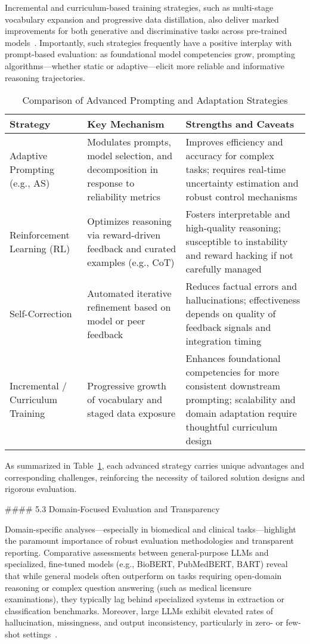 \documentclass[11pt]{article}
\begin{document}
Incremental and curriculum-based training strategies, such as multi-stage vocabulary expansion and progressive data distillation, also deliver marked improvements for both generative and discriminative tasks across pre-trained models~\cite{49}. Importantly, such strategies frequently have a positive interplay with prompt-based evaluation: as foundational model competencies grow, prompting algorithms—whether static or adaptive—elicit more reliable and informative reasoning trajectories.

\begin{table}[ht]
\centering
\caption{Comparison of Advanced Prompting and Adaptation Strategies}
\label{tab:prompt_adaptation_comparison}
\begin{tabular}{|p{4cm}|p{5cm}|p{5cm}|}
\hline
\textbf{Strategy} & \textbf{Key Mechanism} & \textbf{Strengths and Caveats} \\
\hline
Adaptive Prompting (e.g., AS) & Modulates prompts, model selection, and decomposition in response to reliability metrics & Improves efficiency and accuracy for complex tasks; requires real-time uncertainty estimation and robust control mechanisms \\
\hline
Reinforcement Learning (RL) & Optimizes reasoning via reward-driven feedback and curated examples (e.g., CoT) & Fosters interpretable and high-quality reasoning; susceptible to instability and reward hacking if not carefully managed \\
\hline
Self-Correction & Automated iterative refinement based on model or peer feedback & Reduces factual errors and hallucinations; effectiveness depends on quality of feedback signals and integration timing \\
\hline
Incremental / Curriculum Training & Progressive growth of vocabulary and staged data exposure & Enhances foundational competencies for more consistent downstream prompting; scalability and domain adaptation require thoughtful curriculum design \\
\hline
\end{tabular}
\end{table}

As summarized in Table~\ref{tab:prompt_adaptation_comparison}, each advanced strategy carries unique advantages and corresponding challenges, reinforcing the necessity of tailored solution designs and rigorous evaluation.

#### 5.3 Domain-Focused Evaluation and Transparency

Domain-specific analyses—especially in biomedical and clinical tasks—highlight the paramount importance of robust evaluation methodologies and transparent reporting. Comparative assessments between general-purpose LLMs and specialized, fine-tuned models (e.g., BioBERT, PubMedBERT, BART) reveal that while general models often outperform on tasks requiring open-domain reasoning or complex question answering (such as medical licensure examinations), they typically lag behind specialized systems in extraction or classification benchmarks. Moreover, large LLMs exhibit elevated rates of hallucination, missingness, and output inconsistency, particularly in zero- or few-shot settings~\cite{94,95}.
\end{document}
